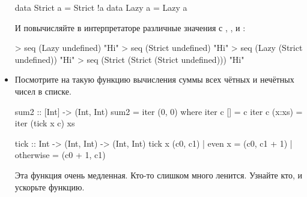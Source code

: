 \begin{itemize}
\begin{code}
data Strict a = Strict !a
data Lazy   a = Lazy    a
\end{code} 

И повычисляйте в интерпретаторе различные значения с ,
, \In{($!)} и :

\begin{code}
> seq (Lazy undefined) "Hi"
> seq (Strict undefined) "Hi"
> seq (Lazy (Strict undefined)) "Hi"
> seq (Strict (Strict (Strict undefined))) "Hi"
\end{code} 

\item Посмотрите на такую функцию вычисления суммы
        всех чётных и нечётных чисел в списке. 

\begin{code}
sum2 :: [Int] -> (Int, Int)
sum2 = iter (0, 0)
    where iter c  []     = c
          iter c  (x:xs) = iter (tick x c) xs

tick :: Int -> (Int, Int) -> (Int, Int)
tick x (c0, c1) | even x    = (c0, c1 + 1)
                | otherwise = (c0 + 1, c1)
\end{code} 

    Эта функция очень медленная. Кто-то слишком много ленится.
    Узнайте кто, и ускорьте функцию.
   
\end{itemize}
